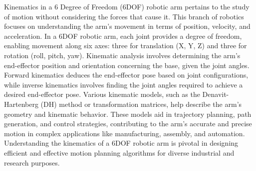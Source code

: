 Kinematics in a 6 Degree of Freedom (6DOF) robotic arm pertains to the study of motion without considering the forces that cause it. This branch of robotics focuses on understanding the arm's movement in terms of position, velocity, and acceleration. In a 6DOF robotic arm, each joint provides a degree of freedom, enabling movement along six axes: three for translation (X, Y, Z) and three for rotation (roll, pitch, yaw). Kinematic analysis involves determining the arm's end-effector position and orientation concerning the base, given the joint angles. Forward kinematics deduces the end-effector pose based on joint configurations, while inverse kinematics involves finding the joint angles required to achieve a desired end-effector pose. Various kinematic models, such as the Denavit-Hartenberg (DH) method or transformation matrices, help describe the arm's geometry and kinematic behavior. These models aid in trajectory planning, path generation, and control strategies, contributing to the arm's accurate and precise motion in complex applications like manufacturing, assembly, and automation. Understanding the kinematics of a 6DOF robotic arm is pivotal in designing efficient and effective motion planning algorithms for diverse industrial and research purposes.



